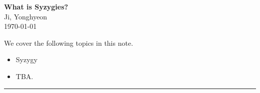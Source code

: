 \documentclass[11pt,openany]{article}
\begin{document}
\begin{center}
\huge\textbf{What is Syzygies?}\\
\vspace{0.5em}
\large{Ji, Yonghyeon}\\
\vspace{0.5em}
\normalsize{\today}\\
\end{center}

\noindent 
We cover the following topics in this note.
\begin{itemize}
\item Syzygy
\item TBA.
\end{itemize}
\hrule\vspace{12pt}
\end{document}
